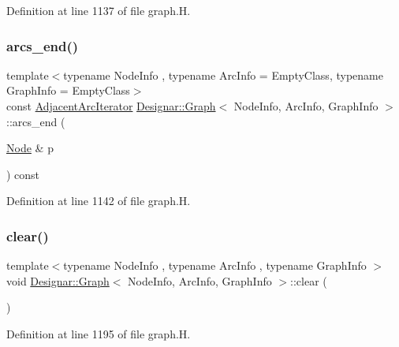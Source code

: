 Definition at line 1137 of file graph.\+H.

\mbox{\label{class_designar_1_1_graph_a305a413007d60401317366c92245bfa4}} 
\subsubsection{\texorpdfstring{arcs\+\_\+end()}{arcs\_end()}\hspace{0.1cm}{\footnotesize\ttfamily [4/4]}}
{\footnotesize\ttfamily template$<$typename Node\+Info , typename Arc\+Info  = Empty\+Class, typename Graph\+Info  = Empty\+Class$>$ \\
const \hyperlink{class_designar_1_1_graph_1_1_adjacent_arc_iterator}{Adjacent\+Arc\+Iterator} \hyperlink{class_designar_1_1_graph}{Designar\+::\+Graph}$<$ Node\+Info, Arc\+Info, Graph\+Info $>$\+::arcs\+\_\+end (\begin{DoxyParamCaption}\item[{\hyperlink{class_designar_1_1_graph_a5dfc7dba9d092ac489c72e40390c37d0}{Node} \&}]{p }\end{DoxyParamCaption}) const\hspace{0.3cm}{\ttfamily [inline]}}



Definition at line 1142 of file graph.\+H.

\mbox{\label{class_designar_1_1_graph_acfebca533d00dae0c40b0dd88f64296c}} 
\subsubsection{\texorpdfstring{clear()}{clear()}}
{\footnotesize\ttfamily template$<$typename Node\+Info , typename Arc\+Info , typename Graph\+Info $>$ \\
void \hyperlink{class_designar_1_1_graph}{Designar\+::\+Graph}$<$ Node\+Info, Arc\+Info, Graph\+Info $>$\+::clear (\begin{DoxyParamCaption}{ }\end{DoxyParamCaption})}



Definition at line 1195 of file graph.\+H.

